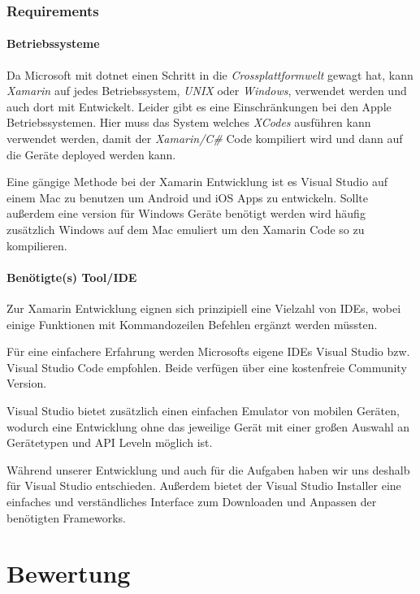 \documentclass[12pt]{article}
\begin{document}
\subsubsection{Requirements}
\paragraph{Betriebssysteme}
Da Microsoft mit dotnet einen Schritt in die \textit{Crossplattformwelt} gewagt hat, kann \textit{Xamarin} auf jedes Betriebssystem, \textit{UNIX} oder \textit{Windows}, verwendet werden und auch dort mit Entwickelt. Leider gibt es eine Einschränkungen bei den Apple Betriebssystemen. Hier muss das System welches \textit{XCodes} ausführen kann verwendet werden, damit der \textit{Xamarin/C\#} Code kompiliert wird und dann auf die Geräte deployed werden kann.

Eine gängige Methode bei der Xamarin Entwicklung ist es Visual Studio auf einem Mac zu benutzen um Android und iOS Apps zu entwickeln. Sollte außerdem eine version für Windows Geräte benötigt werden wird häufig zusätzlich Windows auf dem Mac emuliert um den Xamarin Code so zu kompilieren.

\paragraph{Benötigte(s) Tool/IDE}
Zur Xamarin Entwicklung eignen sich prinzipiell eine Vielzahl von IDEs, wobei einige Funktionen mit Kommandozeilen Befehlen ergänzt werden müssten.

Für eine einfachere Erfahrung werden Microsofts eigene IDEs Visual Studio bzw. Visual Studio Code empfohlen. Beide verfügen über eine kostenfreie Community Version.

Visual Studio bietet zusätzlich einen einfachen Emulator von mobilen Geräten, wodurch eine Entwicklung ohne das jeweilige Gerät mit einer großen Auswahl an Gerätetypen und API Leveln möglich ist.

Während unserer Entwicklung  und auch für die Aufgaben haben wir uns  deshalb für Visual Studio entschieden. Außerdem bietet der Visual Studio Installer eine einfaches und verständliches Interface zum Downloaden und Anpassen der benötigten Frameworks.

% 

\section{Bewertung}
\end{document}
